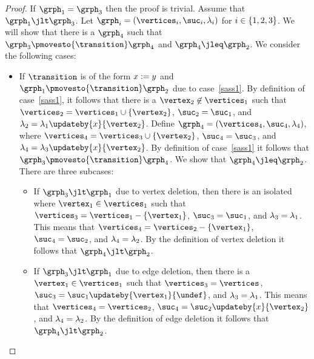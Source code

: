 \begin{proof}
If $\grph_1=\grph_3$ then the proof is trivial.
%
Assume that $\grph_1\jlt\grph_3$.
%
Let $\grph_i=\tuple{\vertices_i,\suc_i,\labeling_i}$ for $i\in\left\{1,2,3\right\}$.
%
We will show that 
there
is a  $\grph_4$ such that $\grph_3\pmovesto{\transition}\grph_4$ and
$\grph_4\jleq\grph_2$.
%
We consider the following cases:
\begin{itemize}
\item
If $\transition$ is of the form $x:=y$ and 
 $\grph_1\pmovesto{\transition}\grph_2$ due to case~\ref{sass1}.
%
By definition of case~\ref{sass1}, it follows 
that there is a $\vertex_2\not\in\vertices_1$ such that
$\vertices_2=\vertices_1\cup\set{\vertex_2}$,
$\suc_2=\suc_1$, and $\labeling_2=\labeling_1\updateby{\xvar}{\vertex_2}$.
%
Define $\grph_4=\tuple{\vertices_4,\suc_4,\labeling_4}$, where
$\vertices_4=\vertices_3\cup\set{\vertex_2}$,
$\suc_4=\suc_3$, and $\labeling_4=\labeling_3\updateby{\xvar}{\vertex_2}$.
%
By definition of case~\ref{sass1} it follows that
$\grph_3\pmovesto{\transition}\grph_4$.
%
We show that $\grph_4\jleq\grph_2$.
%
There are three subcases:
%
\begin{itemize}
\item
If $\grph_3\jlt\grph_1$ due to vertex deletion, then
there is an isolated where $\vertex_1\in\vertices_1$ such that 
$\vertices_3=\vertices_1-\set{\vertex_1}$, 
$\suc_3=\suc_1$, and $\lambda_3=\lambda_1$.
%
This means that 
$\vertices_4=\vertices_2-\set{\vertex_1}$, 
$\suc_4=\suc_2$, and $\lambda_4=\lambda_2$.
%
By the definition of vertex deletion it follows that
$\grph_4\jlt\grph_2$.

\item
If $\grph_3\jlt\grph_1$ due to edge deletion, then
there is a $\vertex_1\in\vertices_1$ such that
$\vertices_3=\vertices$, $\suc_3=\suc_1\updateby{\vertex_1}{\undef}$,
and $\lambda_3=\lambda_1$.
%
%
This means that 
$\vertices_4=\vertices_2$,
$\suc_4=\suc_2\updateby{\xvar}{\vertex_2}$, 
and $\lambda_4=\lambda_2$.
%
By the definition of edge deletion it follows that
$\grph_4\jlt\grph_2$.


\end{itemize}
\end{itemize}
\end{proof}
